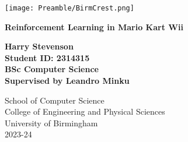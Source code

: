 
\thispagestyle{empty}

\begin{spacing}{2}
	\begin{center}
		\texttt{[image: Preamble/BirmCrest.png]}
	\end{center}
	\vspace{10mm}
	\begin{center}
		\textbf{\Large Reinforcement Learning in Mario Kart Wii}
		\vspace{10mm}
	\end{center}
	\begin{center}
		\vspace{20mm}
		\textbf{\Large Harry Stevenson}
            \\\textbf{\large Student ID: 2314315}
            \\\textbf{\large BSc Computer Science}
            \\\textbf{\large Supervised by Leandro Minku}
		\vspace{30mm}
	\end{center}
	\begin{center}
		{\large School of Computer Science}
		\\ {\large College of Engineering and Physical Sciences}
		\\ {\large University of Birmingham}
		\\ {\large 2023-24}
	\end{center}
\end{spacing}


